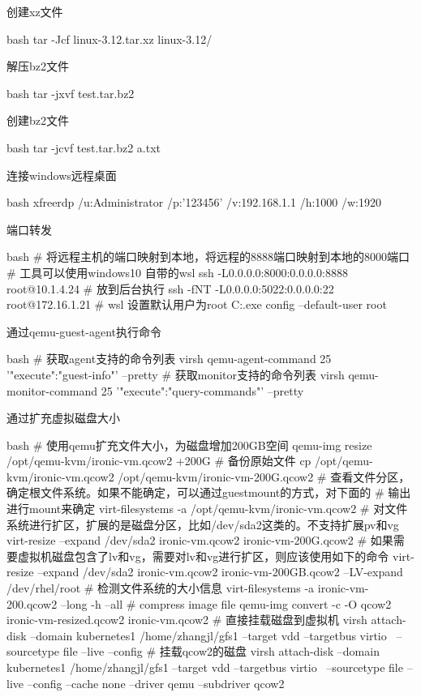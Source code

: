\begin{outline}[enumerate]
\1 创建xz文件
\begin{code-block}{bash}
tar -Jcf linux-3.12.tar.xz linux-3.12/
\end{code-block}

\1 解压bz2文件
\begin{code-block}{bash}
tar -jxvf test.tar.bz2
\end{code-block}

\1 创建bz2文件
\begin{code-block}{bash}
tar -jcvf test.tar.bz2 a.txt
\end{code-block}

\1 连接windows远程桌面
\begin{code-block}{bash}
xfreerdp /u:Administrator /p:'123456' /v:192.168.1.1  /h:1000 /w:1920
\end{code-block}

\1 端口转发
\begin{code-block}{bash}
# 将远程主机的端口映射到本地，将远程的8888端口映射到本地的8000端口
# 工具可以使用windows10 自带的wsl
ssh -L0.0.0.0:8000:0.0.0.0:8888 root@10.1.4.24
# 放到后台执行
ssh -fNT -L0.0.0.0:5022:0.0.0.0:22 root@172.16.1.21
# wsl 设置默认用户为root
C:\Users\zhangjl\AppData\Local\Microsoft\WindowsApps\fedoraremix.exe config --default-user root
\end{code-block}

\1 通过qemu-guest-agent执行命令
\begin{code-block}{bash}
# 获取agent支持的命令列表
virsh qemu-agent-command 25 '{"execute":"guest-info"}' --pretty
# 获取monitor支持的命令列表
virsh qemu-monitor-command 25 '{"execute":"query-commands"}' --pretty
\end{code-block}

\1 通过扩充虚拟磁盘大小
\begin{code-block}{bash}
# 使用qemu扩充文件大小，为磁盘增加200GB空间
qemu-img resize /opt/qemu-kvm/ironic-vm.qcow2 +200G
# 备份原始文件
cp /opt/qemu-kvm/ironic-vm.qcow2 /opt/qemu-kvm/ironic-vm-200G.qcow2
# 查看文件分区，确定根文件系统。如果不能确定，可以通过guestmount的方式，对下面的
# 输出进行mount来确定
virt-filesystems -a /opt/qemu-kvm/ironic-vm.qcow2
# 对文件系统进行扩区，扩展的是磁盘分区，比如/dev/sda2这类的。不支持扩展pv和vg
virt-resize --expand /dev/sda2 ironic-vm.qcow2 ironic-vm-200G.qcow2
# 如果需要虚拟机磁盘包含了lv和vg，需要对lv和vg进行扩区，则应该使用如下的命令
virt-resize --expand /dev/sda2 ironic-vm.qcow2 ironic-vm-200GB.qcow2 --LV-expand /dev/rhel/root
# 检测文件系统的大小信息
virt-filesystems -a ironic-vm-200.qcow2 --long -h --all
# compress image file
qemu-img convert -c -O qcow2 ironic-vm-resized.qcow2 ironic-vm.qcow2
# 直接挂载磁盘到虚拟机
virsh attach-disk --domain kubernetes1  /home/zhangjl/gfs1 --target vdd --targetbus virtio  \
    --sourcetype file --live --config
# 挂载qcow2的磁盘
virsh attach-disk --domain kubernetes1  /home/zhangjl/gfs1 --target vdd --targetbus virtio  \
    --sourcetype file --live --config --cache none --driver qemu --subdriver qcow2
\end{code-block}


\end{outline}
